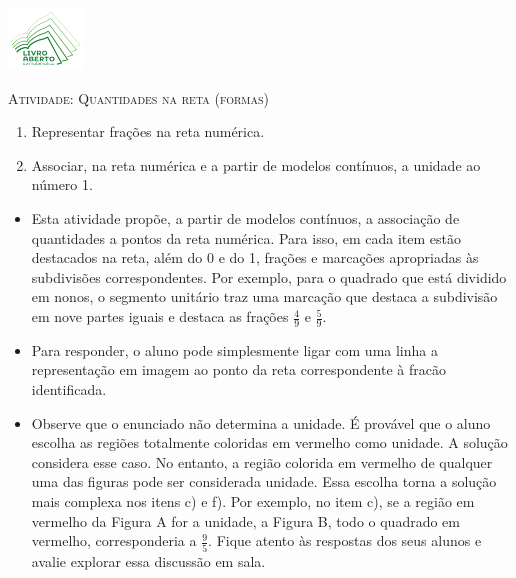 \documentclass[10 pt,usenames,dvipsnames, oneside]{article}
\begin{document}
\begin{center}
  \begin{minipage}[l]{3cm}
\includegraphics[width=2cm]{../../../Figuras/logo}       
\end{minipage}\hfill
\begin{minipage}[r]{.8\textwidth}
 {\Large \scshape Atividade: Quantidades na reta (formas)}  
\end{minipage}
\end{center}
\vspace{.2cm}

\ifdefined\prof
\begin{goals}
\begin{enumerate}
\item Representar frações na reta numérica.
\item Associar, na reta numérica e a partir de modelos contínuos, a unidade ao número 1.
\end{enumerate}

\tcblower

\begin{itemize}
\item Esta atividade propõe, a partir de modelos contínuos, a associação de quantidades a pontos da reta numérica. Para isso, em cada item estão destacados na reta, além do 0 e do 1, frações e marcações apropriadas às subdivisões correspondentes. Por exemplo, para o quadrado que  está dividido em nonos, o segmento unitário traz uma marcação que destaca a subdivisão em nove partes iguais e destaca as frações $\frac{4}{9}$ e $\frac{5}{9}$.
\item Para responder, o aluno pode simplesmente ligar com uma linha a representação em imagem ao ponto da reta correspondente à fracão identificada.
\item Observe que o enunciado não determina a unidade. É provável que o aluno escolha as regiões totalmente coloridas em vermelho como unidade. A solução considera esse caso. No entanto, a região colorida em vermelho de qualquer uma das figuras pode ser considerada unidade. Essa escolha torna a solução mais complexa nos itens c) e f). Por exemplo, no item c), se a região em vermelho da Figura A for a unidade, a Figura B, todo o quadrado em vermelho, corresponderia a $\frac{9}{5}$. Fique atento às respostas dos seus alunos e avalie explorar essa discussão em sala.
\end{itemize}
\end{goals}
\end{document}

